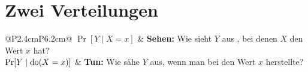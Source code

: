 \section{Zwei Verteilungen}

\begin{definition}
\begin{center}
{\small
\renewcommand{\arraystretch}{1.55}
\begin{tabular}{@{}P{2.4cm}P{6.2cm}@{}}
\toprule
$\Pr[Y \mid X = x]$ & \textbf{Sehen:} Wie sieht $Y$ aus , bei denen $X$ den Wert $x$ hat?\\
$\Pr[Y \mid \operatorname{do}(X=x)]$ & \textbf{Tun:} Wie sähe $Y$ aus, wenn man bei  den Wert $x$ herstellte?\\
\bottomrule
\end{tabular}}
\end{center}
\end{definition}

